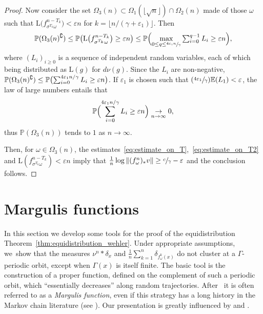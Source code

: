 \documentclass[11pt]{article}
\newcommand{\Psfrac}[2]{(\sfrac{#1}{#2})}
\let\ts\textstyle\let\varstar\ast
\let\e\varepsilon
\newcommand{\norm}[1]{{\left\Vert#1\right\Vert}}
\newcommand{\unsur}[1]{\frac{1}{#1}}
\newcommand{\lrpar}[1]{\left(#1\right)}
\newcommand{\alrpar}[1]{(#1)}
\newcommand{\blrpar}[1]{\bigl(#1\bigr)}
\newcommand{\Blrpar}[1]{\Bigl(#1\Bigr)}
\newcommand{\ee}{\mathbb{E}}
\newcommand{\pp}{\mathbb{P}}\let\P\pp
\theoremstyle{plain}
\theoremstyle{definition}
\numberwithin{equation}{section}
\begin{document}
\begin{proof}
Now consider the set $\Omega_3(n)\subset \Omega_1(\lfloor\sqrt{n}\rfloor)\cap \Omega_2(n)$ made of those
$\omega$ such that $\mathrm L\blrpar{ f^{n-T_{k}}_{\sigma^{T_{k} }\omega}} < \e n$ for $k= \lfloor n/(\gamma+\e_1)\rfloor $. Then
\begin{equation*}
\pp(\Omega_3(n)^\complement)\leq \pp\blrpar{\mathrm L\blrpar{ f^{n-T_{k}}_{\sigma^{T_{k} }\omega}} \geq \e n}\leq
\pp\Blrpar{\max_{0\leq q\leq \sfrac{4\e_1n}{\gamma}} \ts\sum_{i=0}^{q-1} L_i \geq \e n},
\end{equation*}
where $(L_i)_{i\geq 0}$ is a sequence of independent random variables, each of which being
distributed as $\mathrm L(g)$ for $d\nu(g)$. Since the $L_i$ are non-negative, $\pp(\Omega_3(n)^\complement)\leq\pp\blrpar{ \sum_{i=0}^{4\e_1 n/\gamma} L_i \geq\nobreak \e n}$. If $\e_1$ is chosen such that $\Psfrac{4\e_1}{\gamma} \ee(L_1) < \e$, the law of large numbers entails that
\begin{equation*}
\pp \Blrpar{ \sum_{i=0}^{4\e_1 n/\gamma} L_i \geq \e n} \underset{n\to\infty}\to 0,
\end{equation*}
thus $ \pp \lrpar{ \Omega_3(n)}$ tends to $1$ as $n\to \infty$.

Then, for $\omega \in \Omega_3(n)$, the estimates~\eqref{eq:estimate_on_T},~\eqref{eq:estimate_on_T2}
and $\mathrm L\alrpar{ f^{n-T_{k}}_{\sigma^{T_{k} }\omega}} < \e n$ imply that
$\unsur{n}\log \norm{(f^n_\omega)_\varstar v}\geq \sfrac{c}{\gamma}-\e$
and the conclusion follows.
\end{proof}

\section{Margulis functions}\label{sec:margulis}

In this section we develop some tools for the proof of the equidistribution
Theorem~\ref{thm:equidistribution_wehler}.
Under appropriate assumptions, we~show that the measures
$\nu^n\ast \delta_x$ and $\unsur{n}\sum_{k=1}^n \delta_{f^k_\omega(x)}$
do not cluster at a $\Gamma$-periodic orbit, except when $\Gamma(x)$ is itself finite.
The basic tool is the construction of a proper function, defined on the complement of such a periodic orbit,
which ``essentially decreases''
along random trajectories. After~\cite{eskin-margulis}
it is often
referred to as a \emph{Margulis function}, even if this strategy has a long history in the Markov chain literature (see
\cite{meyn-tweedie}). Our presentation is greatly influenced by \cite{benoist-quint3} and
\cite{benard-desaxce}.
\end{document}
